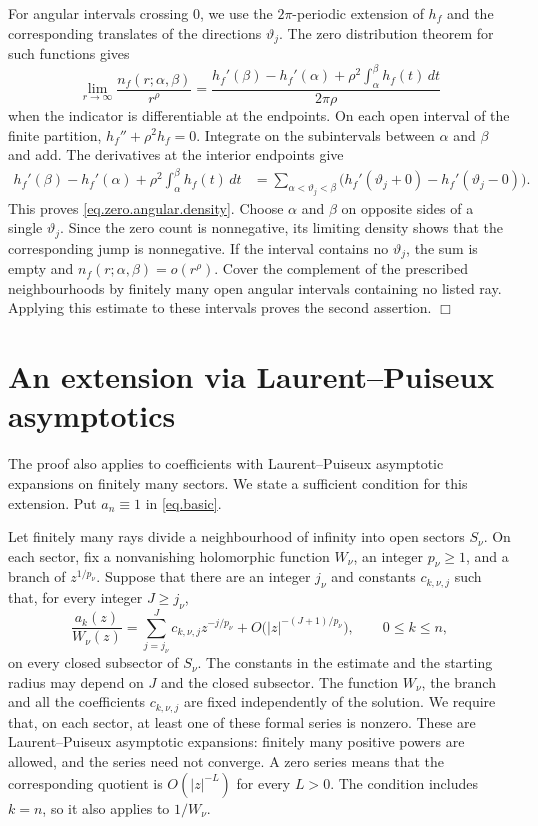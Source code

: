 \documentclass[a4paper,12pt]{article}
\newenvironment{proof}
{\noindent{\it Proof.}}{\hfill $\Box$\par\vspace{2.5mm}}
\numberwithin{equation}{section}
\begin{document}
\begin{proof}
For angular intervals crossing $0$, we use the $2\pi$-periodic extension
of $h_f$ and the corresponding translates of the directions $\vartheta_j$.
The zero distribution theorem for such functions
\cite[Chapter III, Section 3, Theorem 3, pp.~152--155]{Levin1} gives
\[
 \lim_{r\to\infty}\frac{n_f(r;\alpha,\beta)}{r^\rho}
 =\frac{h_f'(\beta)-h_f'(\alpha)
       +\rho^2\int_\alpha^\beta h_f(t)\,dt}{2\pi\rho}
\]
when the indicator is differentiable at the endpoints.
On each open interval of the finite partition,
$h_f''+\rho^2h_f=0$.
Integrate on the subintervals between $\alpha$ and $\beta$ and add.
The derivatives at the interior endpoints give
\[
 \begin{aligned}
 h_f'(\beta)-h_f'(\alpha)+\rho^2\int_\alpha^\beta h_f(t)\,dt
 &=\sum_{\alpha<\vartheta_j<\beta}
       \bigl(h_f'(\vartheta_j+0)-h_f'(\vartheta_j-0)\bigr).
 \end{aligned}
\]
This proves \eqref{eq.zero.angular.density}.
Choose $\alpha$ and $\beta$ on opposite sides of a single $\vartheta_j$.
Since the zero count is nonnegative, its limiting density shows that
the corresponding jump is nonnegative.
If the interval contains no $\vartheta_j$, the sum is empty and
$n_f(r;\alpha,\beta)=o(r^\rho)$.
Cover the complement of the prescribed neighbourhoods by finitely many
open angular intervals containing no listed ray.
Applying this estimate to these intervals proves the second assertion.
\end{proof}

\section{An extension via Laurent--Puiseux asymptotics}\label{sec.concluding}
The proof also applies to coefficients with Laurent--Puiseux asymptotic
expansions on finitely many sectors. We state a sufficient condition for
this extension.
Put $a_n\equiv1$ in \eqref{eq.basic}.

Let finitely many rays divide a neighbourhood of infinity into open
sectors $S_\nu$. On each sector, fix a nonvanishing holomorphic function
$W_\nu$, an integer $p_\nu\ge1$, and a branch of $z^{1/p_\nu}$.
Suppose that there are an integer $j_\nu$ and constants $c_{k,\nu,j}$ such
that, for every integer $J\ge j_\nu$,
\begin{equation}\label{eq.puiseux.coefficients}
 \frac{a_k(z)}{W_\nu(z)}
 =\sum_{j=j_\nu}^{J}c_{k,\nu,j}z^{-j/p_\nu}
   +O\bigl(|z|^{-(J+1)/p_\nu}\bigr),
 \qquad 0\le k\le n,
\end{equation}
on every closed subsector of $S_\nu$.
The constants in the estimate and the starting radius may depend on $J$
and the closed subsector. The function $W_\nu$, the branch and all the
coefficients $c_{k,\nu,j}$ are fixed independently of the solution.
We require that, on each sector, at least one of these formal series is
nonzero. These are Laurent--Puiseux asymptotic expansions: finitely many
positive powers are allowed, and the series need not converge.
A zero series means that the corresponding quotient is $O(|z|^{-L})$
for every $L>0$. The condition includes $k=n$, so it also applies to
$1/W_\nu$.
\end{document}
